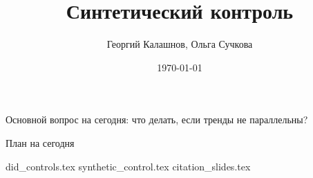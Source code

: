 \documentclass[12pt]{beamer}
\title{Синтетический контроль}
\author[Георгий Калашнов, Ольга Сучкова]{Георгий Калашнов, Ольга Сучкова}
\date{\today}
\begin{document}
\begin{frame}
  \titlepage
  
\end{frame}

\begin{frame}
    Основной вопрос на сегодня: что делать, если тренды не параллельны?
\end{frame}


\begin{frame}{План на сегодня} 
\tableofcontents
\end{frame}

{did_controls.tex}
{synthetic_control.tex}
{citation_slides.tex}
\end{document}
